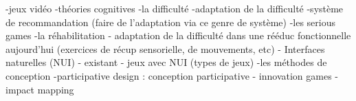 
	
			-jeux vidéo
		-théories cognitives	
		-la difficulté
			-adaptation de la difficulté
			-système de recommandation (faire de l'adaptation via ce genre de système)
		-les serious games
	-la réhabilitation
		- adaptation de la difficulté dans une rééduc fonctionnelle aujourd'hui (exercices de récup sensorielle, de mouvements, etc)
	- Interfaces naturelles (NUI)
		- existant
		- jeux avec NUI (types de jeux)
	-les méthodes de conception
		-participative design : conception participative
		- innovation games
		- impact mapping
